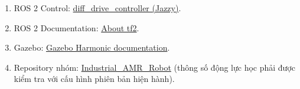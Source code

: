 \documentclass[
  12pt,
  a4paper,
]{article}
\providecommand{\tightlist}{%
  \setlength{\itemsep}{0pt}\setlength{\parskip}{0pt}}
\begin{document}
\begin{enumerate}
\def\labelenumi{\arabic{enumi}.}
\tightlist
\item
  ROS 2 Control:
  \href{https://control.ros.org/jazzy/doc/ros2_controllers/diff_drive_controller/doc/userdoc.html}{diff\_drive\_controller
  (Jazzy)}.
\item
  ROS 2 Documentation:
  \href{https://docs.ros.org/en/jazzy/Concepts/Intermediate/About-Tf2.html}{About
  tf2}.
\item
  Gazebo: \href{https://gazebosim.org/docs/harmonic/}{Gazebo Harmonic
  documentation}.
\item
  Repository nhóm:
  \href{https://github.com/HoangAnh301194/Industrial_AMR_Robot}{Industrial\_AMR\_Robot}
  (thông số động lực học phải được kiểm tra với cấu hình phiên bản hiện
  hành).
\end{enumerate}
\end{document}
